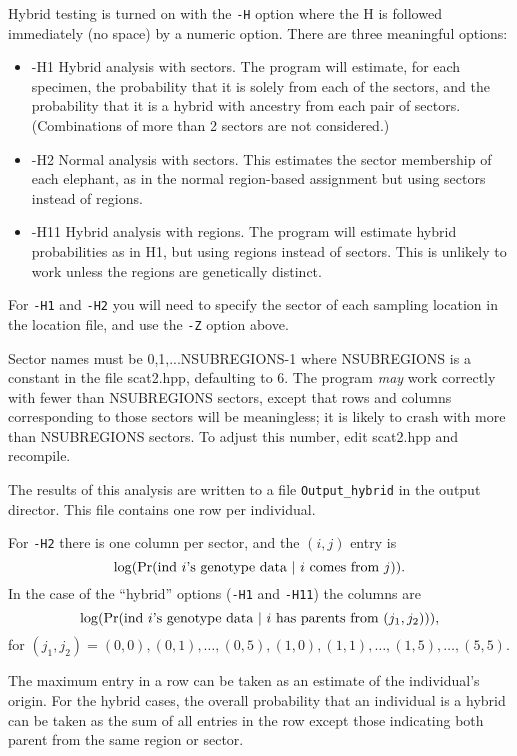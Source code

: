 \documentclass[10pt,titlepage,times,letterpaper]{article}
\def \Pr{{\rm Pr}}
\begin{document}
Hybrid testing is turned on with the {\tt -H} option where the H is
followed immediately (no space) by a numeric option.  There are three
meaningful options:

\begin{itemize}
\item -H1 Hybrid analysis with sectors.  The program will estimate,
for each specimen, the probability that it is solely from each of the
sectors, and the probability that it is a hybrid with ancestry from
each pair of sectors.  (Combinations of more than 2 sectors are
not considered.)
\item -H2  Normal analysis with sectors.   This estimates the
sector membership of each elephant, as in the normal region-based
assignment but using sectors instead of regions.  
\item -H11 Hybrid analysis with regions.  The program will estimate 
hybrid probabilities as in H1, but using regions instead of sectors.  
This is unlikely to work unless the regions are genetically distinct.
\end{itemize}

For {\tt -H1} and {\tt -H2} you will need to specify the sector of
each sampling location in the location file, and use the {\tt -Z} option above. 

Sector names must be 0,1,...NSUBREGIONS-1 where NSUBREGIONS is a
constant in the file scat2.hpp, defaulting to 6.  The program {\it may}
work correctly with fewer than NSUBREGIONS sectors, except that 
rows and columns corresponding to those sectors will be meaningless; it
is likely to crash with more than NSUBREGIONS sectors.  To adjust this
number, edit scat2.hpp and recompile.

The results of this analysis are written to a file {\tt Output\_hybrid} in
the output director.  This file contains one row per individual.

For {\tt -H2} there is one column per sector, and the $(i,j)$ entry
is $$\log(\Pr(\text{ind $i$'s genotype data $\mid$ $i$ comes from $j$})).$$
In the case of the ``hybrid'' options ({\tt -H1} and {\tt -H11}) the columns are
$$\log(\Pr(\text{ind $i$'s genotype data $\mid$ $i$ has parents from $(j_1,j_2)$})),$$
for $(j_1,j_2) = (0,0), (0,1),\dots,(0,5),(1,0),(1,1),\dots,(1,5),\dots, (5,5)$.

The maximum entry in a row can be taken as an estimate of the individual's
origin.  For the hybrid cases, the overall probability that an individual is
a hybrid can be taken as the sum of all entries in the row except those indicating
both parent from the same region or sector.
\end{document}
